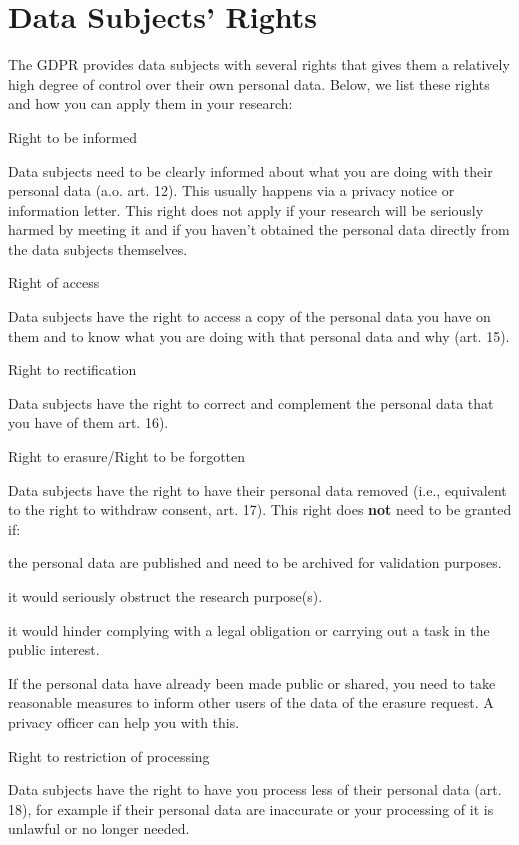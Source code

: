 \documentclass[
]{book}
\begin{document}
\hypertarget{data-subject-rights}{%
\section{Data Subjects' Rights}\label{data-subject-rights}}

The GDPR provides data subjects with several rights that gives them a relatively
high degree of control over their own personal data. Below, we list these rights
and how you can apply them in your research:

Right to be informed

Data subjects need to be clearly informed about what you are doing with their
personal data (a.o. art. 12).
This usually happens via a privacy notice or information letter. This right
does not apply if your research will be seriously harmed by meeting it and if
you haven't obtained the personal data directly from the data subjects themselves.

Right of access

Data subjects have the right to access a copy of the personal data you have
on them and to know what you are doing with that personal data and why
(art. 15).

Right to rectification

Data subjects have the right to correct and complement the personal data
that you have of them
art. 16).

Right to erasure/Right to be forgotten

Data subjects have the right to have their personal data removed (i.e.,
equivalent to the right to withdraw consent,
art. 17).
This right does \textbf{not} need to be granted if:

the personal data are published and need to be archived for validation
purposes.

it would seriously obstruct the research purpose(s).

it would hinder complying with a legal obligation or carrying out a task
in the public interest.

If the personal data have already been made public or shared, you need to
take reasonable measures to inform other users of the data of the erasure
request. A privacy officer can help you with this.

Right to restriction of processing

Data subjects have the right to have you process less of their personal data
(art. 18),
for example if their personal data are inaccurate or your processing of it
is unlawful or no longer needed.
\end{document}
